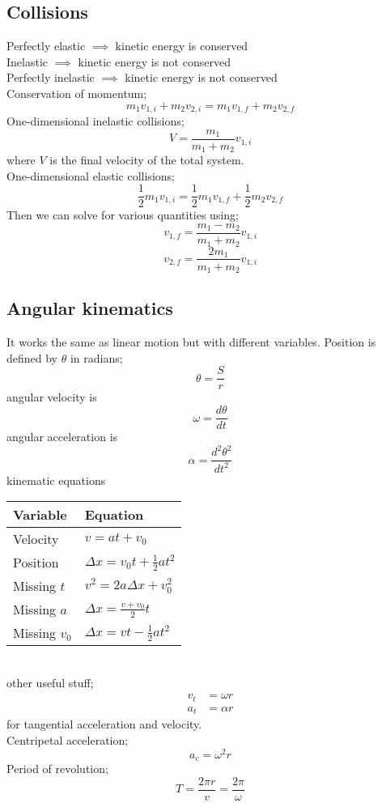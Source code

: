 \documentclass{article}
\begin{document}
\begin{multicols}{2}
\subsection*{Collisions}
Perfectly elastic $\implies$ kinetic energy is conserved \\
Inelastic $\implies$ kinetic energy is not conserved \\
Perfectly inelastic $\implies$ kinetic energy is not conserved\\
Conservation of momentum;
\[
	m_1v_{1,i} + m_2v_{2,i} = m_1v_{1,f} + m_2v_{2,f}
\]
One-dimensional inelastic collisions;
\[
	V= \frac{m_1}{m_1 + m_2}v_{1,i}
\]
where $V$ is the final velocity of the total system.\\
One-dimensional elastic collisions;
\[
	\frac{1}{2}m_1v_{1,i} = \frac{1}{2}m_1v_{1,f} + \frac{1}{2}m_2v_{2,f}
\]
Then we can solve for various quantities using;
\[
	v_{1,f} = \frac{m_1 - m_2}{m_1 + m_2}v_{1,i}
\]
\[
	v_{2,f} = \frac{2m_1}{m_1 + m_2}v_{1,i}
\]

\subsection*{Angular kinematics}
It works the same as linear motion but with different variables. Position is defined by $\theta$ in radians;
\[
	\theta = \frac{S}{r}
\]
angular velocity is
\[
	\omega = \frac{d\theta}{dt}
\]
angular acceleration is
\[
	\alpha = \frac{d^2\theta^2}{dt^2}
\]
kinematic equations \\
    \begin{tabular}{|l|l|}
        \hline
        Variable & Equation \\
        \hline
        Velocity & $v = at + v_0$ \\
        Position & $\Delta x = v_0t + \frac{1}{2}at^2$ \\
        Missing $t$ & $v^2 = 2a\Delta x + v_0^2$ \\
        Missing $a$ & $\Delta x = \frac{v +v_0}{2}t$ \\
        Missing $v_0$ & $\Delta x = vt - \frac{1}{2}at^2$ \\
        \hline
    \end{tabular}\\
other useful stuff;
\begin{align*}
	v_t &= \omega r \\
	a_t &= \alpha r
\end{align*}
for tangential acceleration and velocity. \\
Centripetal acceleration;
\[
	a_c = \omega^2 r
\]
Period of revolution;
\[
	T = \frac{2 \pi r}{v} = \frac{2 \pi}{\omega}
\]


\end{multicols}
\end{document}
